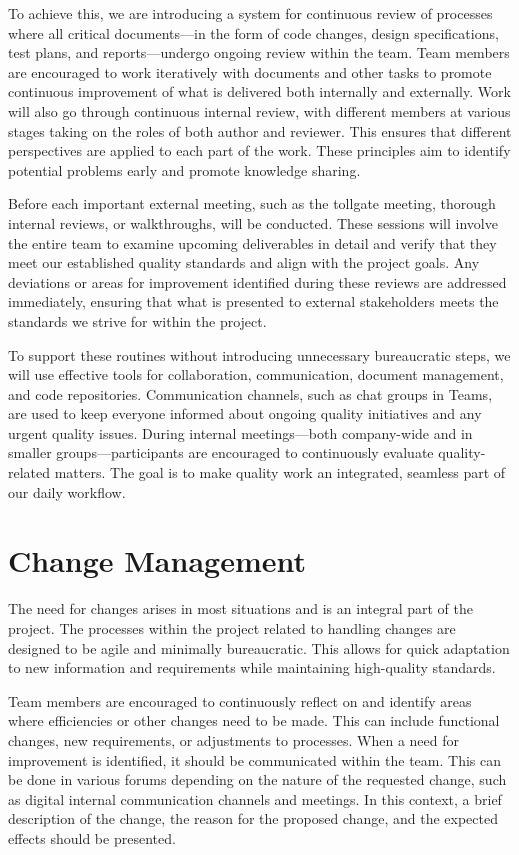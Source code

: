 \documentclass{article}
\begin{document}
To achieve this, we are introducing a system for continuous review of processes where all critical documents—in the form of code changes, design specifications, test plans, and reports—undergo ongoing review within the team. Team members are encouraged to work iteratively with documents and other tasks to promote continuous improvement of what is delivered both internally and externally. Work will also go through continuous internal review, with different members at various stages taking on the roles of both author and reviewer. This ensures that different perspectives are applied to each part of the work. These principles aim to identify potential problems early and promote knowledge sharing.

Before each important external meeting, such as the tollgate meeting, thorough internal reviews, or walkthroughs, will be conducted. These sessions will involve the entire team to examine upcoming deliverables in detail and verify that they meet our established quality standards and align with the project goals. Any deviations or areas for improvement identified during these reviews are addressed immediately, ensuring that what is presented to external stakeholders meets the standards we strive for within the project.

To support these routines without introducing unnecessary bureaucratic steps, we will use effective tools for collaboration, communication, document management, and code repositories. Communication channels, such as chat groups in Teams, are used to keep everyone informed about ongoing quality initiatives and any urgent quality issues. During internal meetings—both company-wide and in smaller groups—participants are encouraged to continuously evaluate quality-related matters. The goal is to make quality work an integrated, seamless part of our daily workflow.

\newpage
\section{Change Management}

The need for changes arises in most situations and is an integral part of the project. The processes within the project related to handling changes are designed to be agile and minimally bureaucratic. This allows for quick adaptation to new information and requirements while maintaining high-quality standards.

Team members are encouraged to continuously reflect on and identify areas where efficiencies or other changes need to be made. This can include functional changes, new requirements, or adjustments to processes. When a need for improvement is identified, it should be communicated within the team. This can be done in various forums depending on the nature of the requested change, such as digital internal communication channels and meetings. In this context, a brief description of the change, the reason for the proposed change, and the expected effects should be presented.
\end{document}
